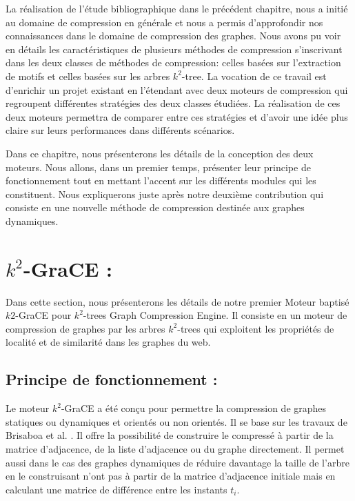 \documentclass[a4paper,oneside,12pt]{report}
\theoremstyle{definition}
\begin{document}
	La réalisation de l'étude bibliographique dans le précédent chapitre, nous a initié au domaine de compression en générale et nous a permis d'approfondir nos connaissances dans le domaine de compression des graphes. Nous avons pu voir en détails les caractéristiques de plusieurs méthodes de compression s'inscrivant dans les deux classes de méthodes de compression: celles basées sur l'extraction de motifs et celles basées sur les arbres $k^2$-tree. La vocation de ce travail est d'enrichir un projet existant en l'étendant avec deux moteurs de compression qui regroupent différentes stratégies des deux classes étudiées. La réalisation de ces deux moteurs permettra de comparer entre ces stratégies et d'avoir une idée plus claire sur leurs performances dans différents scénarios.
	
	Dans ce chapitre, nous présenterons les détails de la conception des deux moteurs. Nous allons, dans un premier temps, présenter leur principe de fonctionnement tout en mettant l'accent sur les différents modules qui les constituent. Nous expliquerons juste après notre deuxième contribution qui consiste en une nouvelle  méthode de compression destinée aux graphes dynamiques.
	

	\section{$k^2$-GraCE : }
	

Dans cette section, nous présenterons les détails de notre premier Moteur baptisé $k2$-GraCE pour $k^2$-trees Graph Compression Engine. Il consiste en un moteur de compression de graphes par les arbres $k^2$-trees qui exploitent les propriétés de localité et de similarité dans les graphes du web. 

		\subsection{Principe de fonctionnement :}
		
	Le moteur $k^2$-GraCE a été conçu pour permettre la compression de graphes statiques ou dynamiques et orientés ou non orientés. Il se base sur les travaux de Brisaboa et al. \citep{brisaboa2009k}. Il offre la possibilité de construire le compressé à partir de la matrice d'adjacence, de la liste d'adjacence ou du graphe directement. Il permet aussi dans le cas des graphes dynamiques de réduire davantage la taille de l'arbre en le construisant n'ont pas à partir de la matrice d'adjacence initiale mais en calculant une matrice de différence entre les instants $t_i$. 
	
\end{document}
